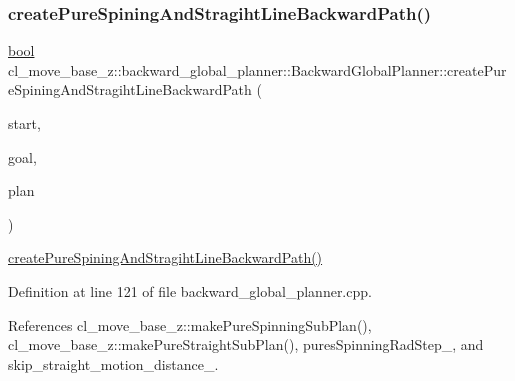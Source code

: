 \subsubsection{\texorpdfstring{create\+Pure\+Spining\+And\+Stragiht\+Line\+Backward\+Path()}{createPureSpiningAndStragihtLineBackwardPath()}}
{\footnotesize\ttfamily \hyperlink{classbool}{bool} cl\+\_\+move\+\_\+base\+\_\+z\+::backward\+\_\+global\+\_\+planner\+::\+Backward\+Global\+Planner\+::create\+Pure\+Spining\+And\+Stragiht\+Line\+Backward\+Path (\begin{DoxyParamCaption}\item[{const geometry\+\_\+msgs\+::\+Pose\+Stamped \&}]{start,  }\item[{const geometry\+\_\+msgs\+::\+Pose\+Stamped \&}]{goal,  }\item[{std\+::vector$<$ geometry\+\_\+msgs\+::\+Pose\+Stamped $>$ \&}]{plan }\end{DoxyParamCaption})\hspace{0.3cm}{\ttfamily [virtual]}}

\hyperlink{classcl__move__base__z_1_1backward__global__planner_1_1BackwardGlobalPlanner_ac6bb75a477a426a3b6060f546964bcbb}{create\+Pure\+Spining\+And\+Stragiht\+Line\+Backward\+Path()} 

Definition at line 121 of file backward\+\_\+global\+\_\+planner.\+cpp.



References cl\+\_\+move\+\_\+base\+\_\+z\+::make\+Pure\+Spinning\+Sub\+Plan(), cl\+\_\+move\+\_\+base\+\_\+z\+::make\+Pure\+Straight\+Sub\+Plan(), pures\+Spinning\+Rad\+Step\+\_\+, and skip\+\_\+straight\+\_\+motion\+\_\+distance\+\_\+.


